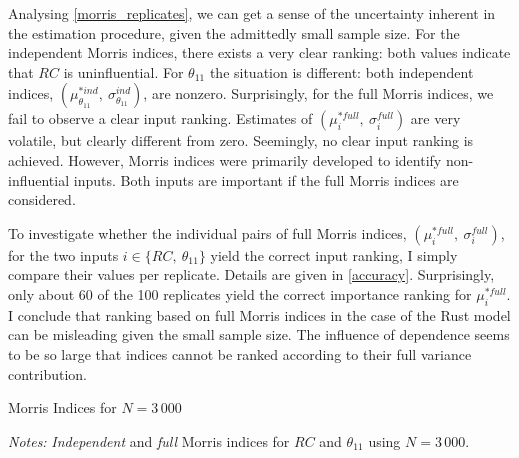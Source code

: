 Analysing \cref{morris_replicates}, we can get a sense of the uncertainty inherent in the estimation procedure,
given the admittedly small sample size. For the independent Morris indices, there exists a
very clear ranking: both values indicate that $RC$ is uninfluential. For $\theta_{11}$ the situation is
different: both independent indices, $(\mu^{\ast ind}_{\theta_{11}},\ \sigma_{\theta_{11}}^{ind})$, are nonzero. Surprisingly, for the full Morris indices,
we fail to observe a clear input ranking. Estimates of $(\mu^{\ast full}_i,\ \sigma_i^{full})$ are very volatile, but
clearly different from zero. Seemingly, no
clear input ranking is achieved. However, Morris indices were primarily developed to
identify non-influential inputs. Both inputs are important if the full Morris indices are
considered.

To investigate whether the individual pairs of full Morris indices, $(\mu^{\ast full}_i,\ \sigma_i^{full})$, for the
two inputs $i \in \{RC,\ \theta_{11}\}$ yield the correct input ranking, I simply compare their values
per replicate. Details are given in \cref{accuracy}. Surprisingly, only about 60 of the 100 replicates yield the correct importance ranking
for $\mu^{\ast full}_i$. I conclude that ranking based on full Morris indices in the case of the Rust model can be misleading given the small sample size.
The influence of dependence seems to be so large that indices cannot be ranked according to their full variance contribution.

\begin{table}[t]
    \centering
    \caption{Morris Indices for $N=3\,000$}
    \label{morris_3000}
    \begin{threeparttable}
    \begin{centering}
        
        \begin{tablenotes}
            \small
            \item \textit{Notes:} \textit{Independent} and \textit{full} Morris indices for $RC$ and $\theta_{11}$ using $N=3\,000$.
        \end{tablenotes}
    \end{centering}

    \end{threeparttable}

\end{table}

